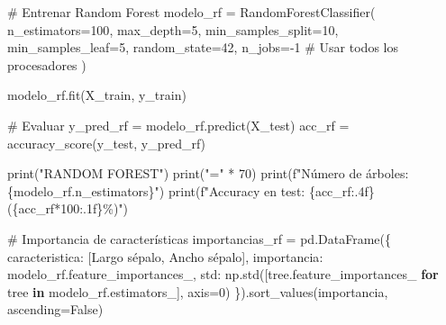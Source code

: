 \documentclass[
  doc,
  floatsintext,
  longtable,
  a4paper,
  nolmodern,
  notxfonts,
  notimes,
  12pt,
  colorlinks=true,linkcolor=blue,citecolor=blue,urlcolor=blue]{apa7}
\newenvironment{Shaded}{\begin{snugshade}}{\end{snugshade}}
\newcommand{\BuiltInTok}[1]{\textcolor[rgb]{0.00,0.23,0.31}{#1}}
\newcommand{\CommentTok}[1]{\textcolor[rgb]{0.37,0.37,0.37}{#1}}
\newcommand{\ControlFlowTok}[1]{\textcolor[rgb]{0.00,0.23,0.31}{\textbf{#1}}}
\newcommand{\DecValTok}[1]{\textcolor[rgb]{0.68,0.00,0.00}{#1}}
\newcommand{\KeywordTok}[1]{\textcolor[rgb]{0.00,0.23,0.31}{\textbf{#1}}}
\newcommand{\NormalTok}[1]{\textcolor[rgb]{0.00,0.23,0.31}{#1}}
\newcommand{\OperatorTok}[1]{\textcolor[rgb]{0.37,0.37,0.37}{#1}}
\newcommand{\SpecialCharTok}[1]{\textcolor[rgb]{0.37,0.37,0.37}{#1}}
\newcommand{\SpecialStringTok}[1]{\textcolor[rgb]{0.13,0.47,0.30}{#1}}
\newcommand{\StringTok}[1]{\textcolor[rgb]{0.13,0.47,0.30}{#1}}
\newcommand{\VariableTok}[1]{\textcolor[rgb]{0.07,0.07,0.07}{#1}}
\begin{document}
\begin{Shaded}
\begin{Highlighting}[]
\CommentTok{\# Entrenar Random Forest}
\NormalTok{modelo\_rf }\OperatorTok{=}\NormalTok{ RandomForestClassifier(}
\NormalTok{    n\_estimators}\OperatorTok{=}\DecValTok{100}\NormalTok{,}
\NormalTok{    max\_depth}\OperatorTok{=}\DecValTok{5}\NormalTok{,}
\NormalTok{    min\_samples\_split}\OperatorTok{=}\DecValTok{10}\NormalTok{,}
\NormalTok{    min\_samples\_leaf}\OperatorTok{=}\DecValTok{5}\NormalTok{,}
\NormalTok{    random\_state}\OperatorTok{=}\DecValTok{42}\NormalTok{,}
\NormalTok{    n\_jobs}\OperatorTok{={-}}\DecValTok{1}  \CommentTok{\# Usar todos los procesadores}
\NormalTok{)}

\NormalTok{modelo\_rf.fit(X\_train, y\_train)}

\CommentTok{\# Evaluar}
\NormalTok{y\_pred\_rf }\OperatorTok{=}\NormalTok{ modelo\_rf.predict(X\_test)}
\NormalTok{acc\_rf }\OperatorTok{=}\NormalTok{ accuracy\_score(y\_test, y\_pred\_rf)}

\BuiltInTok{print}\NormalTok{(}\StringTok{"RANDOM FOREST"}\NormalTok{)}
\BuiltInTok{print}\NormalTok{(}\StringTok{"="} \OperatorTok{*} \DecValTok{70}\NormalTok{)}
\BuiltInTok{print}\NormalTok{(}\SpecialStringTok{f"Número de árboles: }\SpecialCharTok{\{}\NormalTok{modelo\_rf}\SpecialCharTok{.}\NormalTok{n\_estimators}\SpecialCharTok{\}}\SpecialStringTok{"}\NormalTok{)}
\BuiltInTok{print}\NormalTok{(}\SpecialStringTok{f"Accuracy en test: }\SpecialCharTok{\{}\NormalTok{acc\_rf}\SpecialCharTok{:.4f\}}\SpecialStringTok{ (}\SpecialCharTok{\{}\NormalTok{acc\_rf}\OperatorTok{*}\DecValTok{100}\SpecialCharTok{:.1f\}}\SpecialStringTok{\%)"}\NormalTok{)}

\CommentTok{\# Importancia de características}
\NormalTok{importancias\_rf }\OperatorTok{=}\NormalTok{ pd.DataFrame(\{}
    \StringTok{\textquotesingle{}caracteristica\textquotesingle{}}\NormalTok{: [}\StringTok{\textquotesingle{}Largo sépalo\textquotesingle{}}\NormalTok{, }\StringTok{\textquotesingle{}Ancho sépalo\textquotesingle{}}\NormalTok{],}
    \StringTok{\textquotesingle{}importancia\textquotesingle{}}\NormalTok{: modelo\_rf.feature\_importances\_,}
    \StringTok{\textquotesingle{}std\textquotesingle{}}\NormalTok{: np.std([tree.feature\_importances\_ }
                   \ControlFlowTok{for}\NormalTok{ tree }\KeywordTok{in}\NormalTok{ modelo\_rf.estimators\_], axis}\OperatorTok{=}\DecValTok{0}\NormalTok{)}
\NormalTok{\}).sort\_values(}\StringTok{\textquotesingle{}importancia\textquotesingle{}}\NormalTok{, ascending}\OperatorTok{=}\VariableTok{False}\NormalTok{)}


\end{Highlighting}
\end{Shaded}
\end{document}
